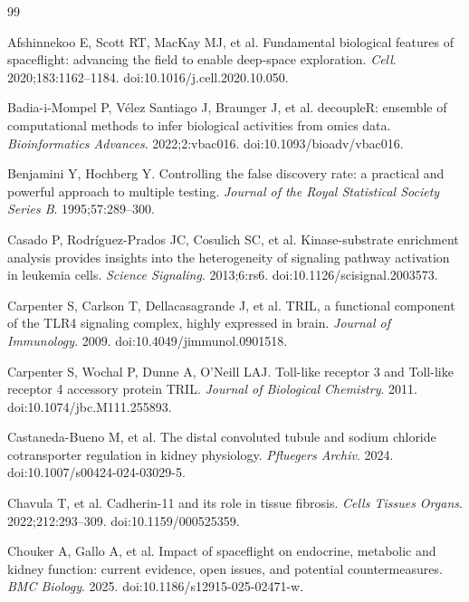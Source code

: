 \documentclass[11pt]{article}
\begin{document}
\begin{thebibliography}{99}\small

 Afshinnekoo E, Scott RT, MacKay MJ, et al. Fundamental biological features of spaceflight: advancing the field to enable deep-space exploration. \emph{Cell}. 2020;183:1162--1184. doi:10.1016/j.cell.2020.10.050.

 Badia-i-Mompel P, V\'elez Santiago J, Braunger J, et al. decoupleR: ensemble of computational methods to infer biological activities from omics data. \emph{Bioinformatics Advances}. 2022;2:vbac016. doi:10.1093/bioadv/vbac016.

 Benjamini Y, Hochberg Y. Controlling the false discovery rate: a practical and powerful approach to multiple testing. \emph{Journal of the Royal Statistical Society Series B}. 1995;57:289--300.

 Casado P, Rodr\'iguez-Prados JC, Cosulich SC, et al. Kinase-substrate enrichment analysis provides insights into the heterogeneity of signaling pathway activation in leukemia cells. \emph{Science Signaling}. 2013;6:rs6. doi:10.1126/scisignal.2003573.

 Carpenter S, Carlson T, Dellacasagrande J, et al. TRIL, a functional component of the TLR4 signaling complex, highly expressed in brain. \emph{Journal of Immunology}. 2009. doi:10.4049/jimmunol.0901518.

 Carpenter S, Wochal P, Dunne A, O'Neill LAJ. Toll-like receptor 3 and Toll-like receptor 4 accessory protein TRIL. \emph{Journal of Biological Chemistry}. 2011. doi:10.1074/jbc.M111.255893.

 Castaneda-Bueno M, et al. The distal convoluted tubule and sodium chloride cotransporter regulation in kidney physiology. \emph{Pfluegers Archiv}. 2024. doi:10.1007/s00424-024-03029-5.

 Chavula T, et al. Cadherin-11 and its role in tissue fibrosis. \emph{Cells Tissues Organs}. 2022;212:293--309. doi:10.1159/000525359.

 Chouker A, Gallo A, et al. Impact of spaceflight on endocrine, metabolic and kidney function: current evidence, open issues, and potential countermeasures. \emph{BMC Biology}. 2025. doi:10.1186/s12915-025-02471-w.


\end{thebibliography}
\end{document}
